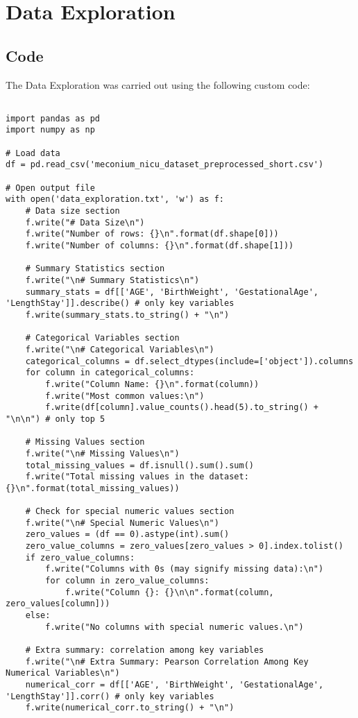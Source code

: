\documentclass[11pt]{article}
\begin{document}
\section{Data Exploration} \subsection{Code}The Data Exploration was carried out using the following custom code:

\begin{verbatim}

import pandas as pd
import numpy as np

# Load data
df = pd.read_csv('meconium_nicu_dataset_preprocessed_short.csv')

# Open output file
with open('data_exploration.txt', 'w') as f:
    # Data size section
    f.write("# Data Size\n")
    f.write("Number of rows: {}\n".format(df.shape[0]))
    f.write("Number of columns: {}\n".format(df.shape[1]))
    
    # Summary Statistics section
    f.write("\n# Summary Statistics\n")
    summary_stats = df[['AGE', 'BirthWeight', 'GestationalAge', 'LengthStay']].describe() # only key variables
    f.write(summary_stats.to_string() + "\n")

    # Categorical Variables section
    f.write("\n# Categorical Variables\n")
    categorical_columns = df.select_dtypes(include=['object']).columns
    for column in categorical_columns:
        f.write("Column Name: {}\n".format(column))
        f.write("Most common values:\n")
        f.write(df[column].value_counts().head(5).to_string() + "\n\n") # only top 5
        
    # Missing Values section
    f.write("\n# Missing Values\n")
    total_missing_values = df.isnull().sum().sum()
    f.write("Total missing values in the dataset: {}\n".format(total_missing_values))

    # Check for special numeric values section
    f.write("\n# Special Numeric Values\n")
    zero_values = (df == 0).astype(int).sum()
    zero_value_columns = zero_values[zero_values > 0].index.tolist()
    if zero_value_columns:
        f.write("Columns with 0s (may signify missing data):\n")
        for column in zero_value_columns:
            f.write("Column {}: {}\n\n".format(column, zero_values[column]))
    else:
        f.write("No columns with special numeric values.\n")

    # Extra summary: correlation among key variables 
    f.write("\n# Extra Summary: Pearson Correlation Among Key Numerical Variables\n")
    numerical_corr = df[['AGE', 'BirthWeight', 'GestationalAge', 'LengthStay']].corr() # only key variables
    f.write(numerical_corr.to_string() + "\n")

\end{verbatim}
\end{document}
